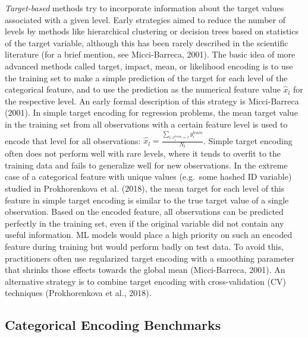 \documentclass[smallextended]{svjour3}       %
\begin{document}
\emph{Target-based} methods try to incorporate information about the target values associated with a given level.
Early strategies aimed to reduce the number of levels by methods like hierarchical clustering or decision trees based on statistics of the target variable, although this has been rarely described in the scientific literature (for a brief mention, see Micci-Barreca, 2001).
The basic idea of more advanced methods called target, impact, mean, or likelihood encoding is to use the training set to make a simple prediction of the target for each level of the categorical feature, and to use the prediction as the numerical feature value \(\hat{x}_l\) for the respective level.
An early formal description of this strategy is Micci-Barreca (2001).
In simple target encoding for regression problems, the mean target value in the training set from all observations with a certain feature level is used to encode that level for all observations: \(\hat{x}_l = \frac{\sum_{i:x^{train}_i = l}y^{train}_i}{N_l}\).
Simple target encoding often does not perform well with rare levels, where it tends to overfit to the training data and fails to generalize well for new observations.
In the extreme case of a categorical feature with unique values (e.g.~some hashed ID variable) studied in Prokhorenkova et al. (2018), the mean target for each level of this feature in simple target encoding is similar to the true target value of a single observation.
Based on the encoded feature, all observations can be predicted perfectly in the training set, even if the original variable did not contain any useful information.
ML models would place a high priority on such an encoded feature during training but would perform badly on test data.
To avoid this, practitioners often use regularized target encoding with a smoothing parameter that shrinks those effects towards the global mean (Micci-Barreca, 2001).
An alternative strategy is to combine target encoding with cross-validation (CV) techniques (Prokhorenkova et al., 2018).

\hypertarget{categorical-encoding-benchmarks}{%
\subsection{Categorical Encoding Benchmarks}\label{categorical-encoding-benchmarks}}
\end{document}
